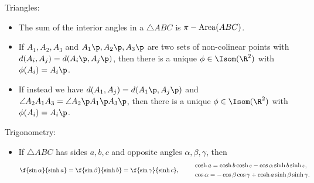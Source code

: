 Triangles:
\begin{itemize}
	\shortskip
	\item The sum of the interior angles in a $\triangle ABC$ is $\pi-\operatorname{Area}(ABC)$.
	\item If $A_1,A_2,A_3$ and $A_1\p,A_2\p,A_3\p$ are two sets of non-colinear points with $d(A_i,A_j) = d(A_i\p,A_j\p)$, then there is a unique $\phi\in\Isom(\R^2)$ with $\phi(A_i) = A_i\p$. %
	\item If instead we have $d(A_1,A_j) = d(A_1\p,A_j\p)$ and $\angle A_2 A_1 A_3 = \angle A_2\p A_1\p A_3\p$, then there is a unique $\phi\in\Isom(\R^2)$ with $\phi(A_i) = A_i\p$. %
\end{itemize}

Trigonometry:
\begin{itemize}
	\item If $\triangle ABC$ has sides $a,b,c$ and opposite angles $\alpha,\beta,\gamma$, then
	\begin{equation*}
		\f{\sin \alpha}{\sinh a} = \f{\sin \beta}{\sinh b} = \f{\sin\gamma}{\sinh c}, \qquad
		\begin{array}{l}
			\cosh a = \cosh b \cosh c - \cos \alpha \sinh b \sinh c, \\[3pt]
			\cos\alpha = -\cos\beta \cos \gamma + \cosh a \sinh \beta\sinh\gamma.
		\end{array}
	\end{equation*}
\end{itemize}

\vfill


